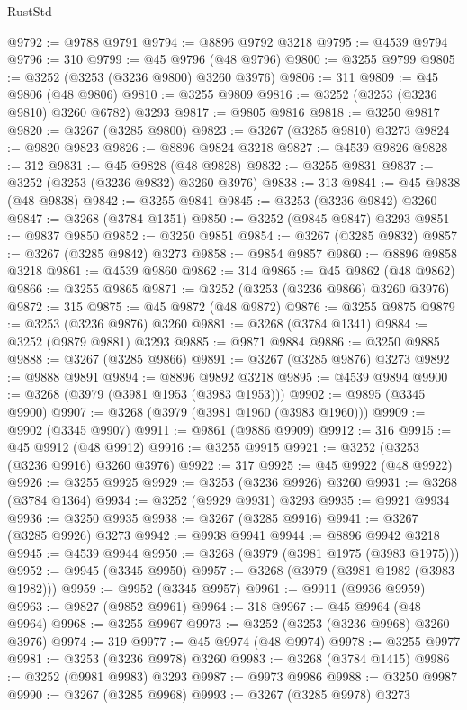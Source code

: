 \begin{lexlean}{RustStd}
\begin{coremodule}
@9792 := @9788 @9791
@9794 := @8896 @9792 @3218
@9795 := @4539 @9794
@9796 := 310
@9799 := @45 @9796 (@48 @9796)
@9800 := @3255 @9799
@9805 := @3252 (@3253 (@3236 @9800) @3260 @3976)
@9806 := 311
@9809 := @45 @9806 (@48 @9806)
@9810 := @3255 @9809
@9816 := @3252 (@3253 (@3236 @9810) @3260 @6782) @3293
@9817 := @9805 @9816
@9818 := @3250 @9817
@9820 := @3267 (@3285 @9800)
@9823 := @3267 (@3285 @9810) @3273
@9824 := @9820 @9823
@9826 := @8896 @9824 @3218
@9827 := @4539 @9826
@9828 := 312
@9831 := @45 @9828 (@48 @9828)
@9832 := @3255 @9831
@9837 := @3252 (@3253 (@3236 @9832) @3260 @3976)
@9838 := 313
@9841 := @45 @9838 (@48 @9838)
@9842 := @3255 @9841
@9845 := @3253 (@3236 @9842) @3260
@9847 := @3268 (@3784 @1351)
@9850 := @3252 (@9845 @9847) @3293
@9851 := @9837 @9850
@9852 := @3250 @9851
@9854 := @3267 (@3285 @9832)
@9857 := @3267 (@3285 @9842) @3273
@9858 := @9854 @9857
@9860 := @8896 @9858 @3218
@9861 := @4539 @9860
@9862 := 314
@9865 := @45 @9862 (@48 @9862)
@9866 := @3255 @9865
@9871 := @3252 (@3253 (@3236 @9866) @3260 @3976)
@9872 := 315
@9875 := @45 @9872 (@48 @9872)
@9876 := @3255 @9875
@9879 := @3253 (@3236 @9876) @3260
@9881 := @3268 (@3784 @1341)
@9884 := @3252 (@9879 @9881) @3293
@9885 := @9871 @9884
@9886 := @3250 @9885
@9888 := @3267 (@3285 @9866)
@9891 := @3267 (@3285 @9876) @3273
@9892 := @9888 @9891
@9894 := @8896 @9892 @3218
@9895 := @4539 @9894
@9900 := @3268 (@3979 (@3981 @1953 (@3983 @1953)))
@9902 := @9895 (@3345 @9900)
@9907 := @3268 (@3979 (@3981 @1960 (@3983 @1960)))
@9909 := @9902 (@3345 @9907)
@9911 := @9861 (@9886 @9909)
@9912 := 316
@9915 := @45 @9912 (@48 @9912)
@9916 := @3255 @9915
@9921 := @3252 (@3253 (@3236 @9916) @3260 @3976)
@9922 := 317
@9925 := @45 @9922 (@48 @9922)
@9926 := @3255 @9925
@9929 := @3253 (@3236 @9926) @3260
@9931 := @3268 (@3784 @1364)
@9934 := @3252 (@9929 @9931) @3293
@9935 := @9921 @9934
@9936 := @3250 @9935
@9938 := @3267 (@3285 @9916)
@9941 := @3267 (@3285 @9926) @3273
@9942 := @9938 @9941
@9944 := @8896 @9942 @3218
@9945 := @4539 @9944
@9950 := @3268 (@3979 (@3981 @1975 (@3983 @1975)))
@9952 := @9945 (@3345 @9950)
@9957 := @3268 (@3979 (@3981 @1982 (@3983 @1982)))
@9959 := @9952 (@3345 @9957)
@9961 := @9911 (@9936 @9959)
@9963 := @9827 (@9852 @9961)
@9964 := 318
@9967 := @45 @9964 (@48 @9964)
@9968 := @3255 @9967
@9973 := @3252 (@3253 (@3236 @9968) @3260 @3976)
@9974 := 319
@9977 := @45 @9974 (@48 @9974)
@9978 := @3255 @9977
@9981 := @3253 (@3236 @9978) @3260
@9983 := @3268 (@3784 @1415)
@9986 := @3252 (@9981 @9983) @3293
@9987 := @9973 @9986
@9988 := @3250 @9987
@9990 := @3267 (@3285 @9968)
@9993 := @3267 (@3285 @9978) @3273

\end{coremodule}
\end{lexlean}
